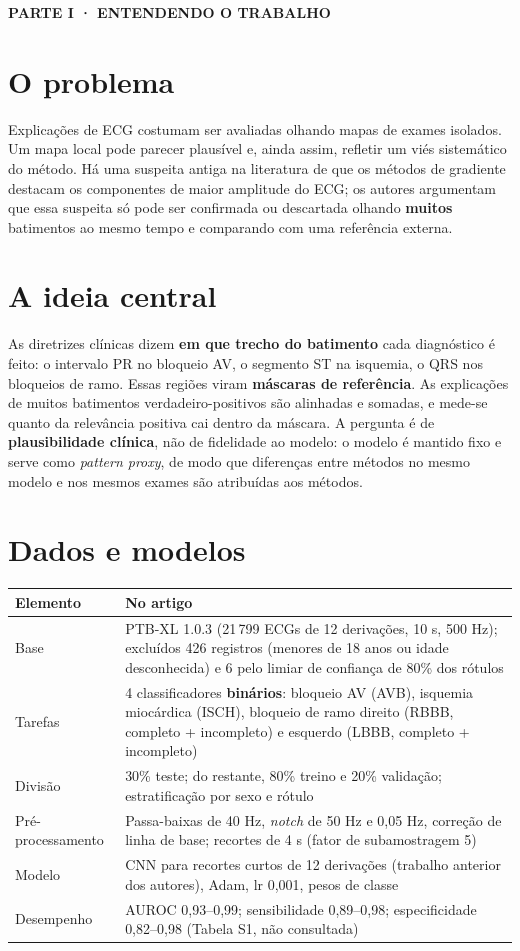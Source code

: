 \documentclass[11pt,a4paper]{article}
\newcommand{\partbar}[1]{\par\vspace{1.2em}\noindent\colorbox{black!80}{\parbox{\dimexpr\linewidth-2\fboxsep}{\color{white}\bfseries\sffamily\MakeUppercase{#1}}}\par\vspace{0.4em}}
\begin{document}
\partbar{Parte I · Entendendo o trabalho}

\section{O problema}
Explicações de ECG costumam ser avaliadas olhando mapas de exames isolados. Um mapa local pode parecer plausível e, ainda assim, refletir um viés sistemático do método. Há uma suspeita antiga na literatura de que os métodos de gradiente destacam os componentes de maior amplitude do ECG; os autores argumentam que essa suspeita só pode ser confirmada ou descartada olhando \textbf{muitos} batimentos ao mesmo tempo e comparando com uma referência externa.

\section{A ideia central}
As diretrizes clínicas dizem \textbf{em que trecho do batimento} cada diagnóstico é feito: o intervalo PR no bloqueio AV, o segmento ST na isquemia, o QRS nos bloqueios de ramo. Essas regiões viram \textbf{máscaras de referência}. As explicações de muitos batimentos verdadeiro-positivos são alinhadas e somadas, e mede-se quanto da relevância positiva cai dentro da máscara. A pergunta é de \textbf{plausibilidade clínica}, não de fidelidade ao modelo: o modelo é mantido fixo e serve como \textit{pattern proxy}, de modo que diferenças entre métodos no mesmo modelo e nos mesmos exames são atribuídas aos métodos.

\section{Dados e modelos}
\begin{center}\small
\begin{tabularx}{\linewidth}{lX}
\toprule
\textbf{Elemento} & \textbf{No artigo} \\
\midrule
Base & PTB-XL 1.0.3 (21\,799 ECGs de 12 derivações, 10 s, 500 Hz); excluídos 426 registros (menores de 18 anos ou idade desconhecida) e 6 pelo limiar de confiança de 80\% dos rótulos \\
Tarefas & 4 classificadores \textbf{binários}: bloqueio AV (AVB), isquemia miocárdica (ISCH), bloqueio de ramo direito (RBBB, completo + incompleto) e esquerdo (LBBB, completo + incompleto) \\
Divisão & 30\% teste; do restante, 80\% treino e 20\% validação; estratificação por sexo e rótulo \\
Pré-processamento & Passa-baixas de 40 Hz, \textit{notch} de 50 Hz e 0,05 Hz, correção de linha de base; recortes de 4 s (fator de subamostragem 5) \\
Modelo & CNN para recortes curtos de 12 derivações (trabalho anterior dos autores), Adam, lr 0,001, pesos de classe \\
Desempenho & AUROC 0,93--0,99; sensibilidade 0,89--0,98; especificidade 0,82--0,98 (Tabela S1, não consultada) \\
\bottomrule
\end{tabularx}
\end{center}
\end{document}
